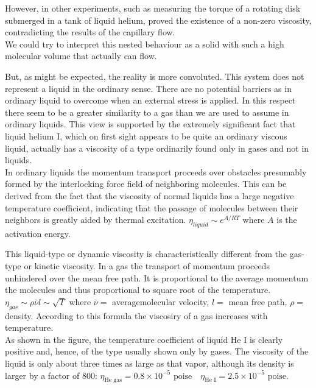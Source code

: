 \documentclass{article}
\begin{document}
However, in other experiments, such as measuring the torque of a rotating disk submerged in a tank of liquid helium, proved the existence of a non-zero viscosity, contradicting the results of the capillary flow.
\\

We could try to interpret this nested behaviour as a solid with such a high molecular volume that actually can flow.

But, as might be expected, the reality is more convoluted. This system does not represent a liquid in the ordinary sense. There are no potential barriers as in ordinary liquid to overcome when an external stress is applied. In this respect there seem to be a greater similarity to a gas than we are used to assume in ordinary liquids. This view is supported by the extremely significant fact that liquid helium I, which on first sight appears to be quite an ordinary viscous liquid, actually has a viscosity of a type ordinarily found only in gases and not in liquids.
\\

In ordinary liquids the momentum transport proceeds over obstacles presumably formed by the interlocking force field of neighboring molecules. This can be derived from the fact that the viscosity of normal liquids has a large negative temperature coefficient, indicating that the passage of molecules between their neighbors is greatly aided by thermal excitation. $\eta_{liquid}\sim e^{A/RT}$ where $A$ is the activation energy.

This liquid-type or dynamic viscosity is characteristically different from the gas-type or kinetic viscosity. In a gas the transport of momentum proceeds unhindered over the mean free path. It is proportional to the average momentum the molecules and thus proportional to square root of the temperature. $\eta_{gas} \sim \rho \overline{\nu} l \sim \sqrt{T}$ where $\overline{\nu} =$ averagemolecular velocity, $l=$ mean free path, $\rho=$ density. According to this formula the viscosiry of a gas increases with temperature.
\\

As shown in the figure, the temperature coefficient of liquid He I is clearly positive and, hence, of the type usually shown only by gases. The viscosity of the liquid is only about three times as large as that vapor, although its density is larger by a factor of 800: $\eta_{\text{He gas}} = 0.8\times 10^{-5} \text{ poise} \quad \eta_{\text{He I}} = 2.5\times 10^{-5} \text{ poise}$.
\\
\end{document}
